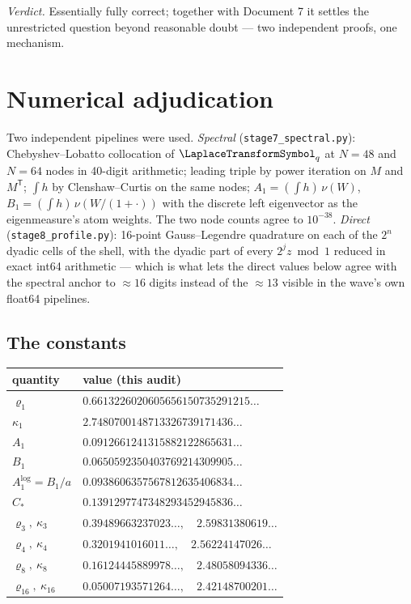 \documentclass[11pt,oneside]{article}
\theoremstyle{definition}
\theoremstyle{remark}
\begin{document}
\emph{Verdict.}  Essentially fully correct; together with Document 7 it
settles the unrestricted question beyond reasonable doubt --- two
independent proofs, one mechanism.

\section{Numerical adjudication}
\label{sec:numerics}

Two independent pipelines were used.
\emph{Spectral} (\nolinkurl{stage7_spectral.py}): Chebyshev--Lobatto
collocation of $\LaplaceTransformSymbol_q$ at $N=48$ and $N=64$ nodes in 40-digit
arithmetic; leading triple by power iteration on $M$ and $M^{\mathsf T}$;
$\int h$ by Clenshaw--Curtis on the same nodes;
$A_1=(\int h)\,\nu(W)$, $B_1=(\int h)\,\nu(W/(1+\cdot))$ with the
discrete left eigenvector as the eigenmeasure's atom weights.  The two
node counts agree to $10^{-38}$.
\emph{Direct} (\nolinkurl{stage8_profile.py}): 16-point Gauss--Legendre
quadrature on each of the $2^n$ dyadic cells of the shell, with the
dyadic part of every $2^jz\bmod1$ reduced in exact int64 arithmetic ---
which is what lets the direct values below agree with the spectral
anchor to $\approx\!16$ digits instead of the $\approx\!13$ visible in
the wave's own float64 pipelines.

\subsection{The constants}
\label{ssec:constants}

\begin{center}
\small
\begin{tabular}{@{}ll@{}}
\toprule
quantity & value (this audit) \\
\midrule
$\varrho_1$ & $0.6613226020605656150735291215\ldots$ \\
$\kappa_1$ & $2.7480700148713326739171436\ldots$ \\
$A_1$ & $0.0912661241315882122865631\ldots$ \\
$B_1$ & $0.0650592350403769214309905\ldots$ \\
$A_1^{\log}=B_1/a$ & $0.0938606357567812635406834\ldots$ \\
$C_*$ & $0.1391297747348293452945836\ldots$ \\
$\varrho_3,\ \kappa_3$ & $0.39489663237023\ldots,\quad 2.59831380619\ldots$ \\
$\varrho_4,\ \kappa_4$ & $0.3201941016011\ldots,\quad 2.56224147026\ldots$ \\
$\varrho_8,\ \kappa_8$ & $0.16124445889978\ldots,\quad 2.48058094336\ldots$ \\
$\varrho_{16},\ \kappa_{16}$ & $0.05007193571264\ldots,\quad 2.42148700201\ldots$ \\
\bottomrule
\end{tabular}
\end{center}
\end{document}
